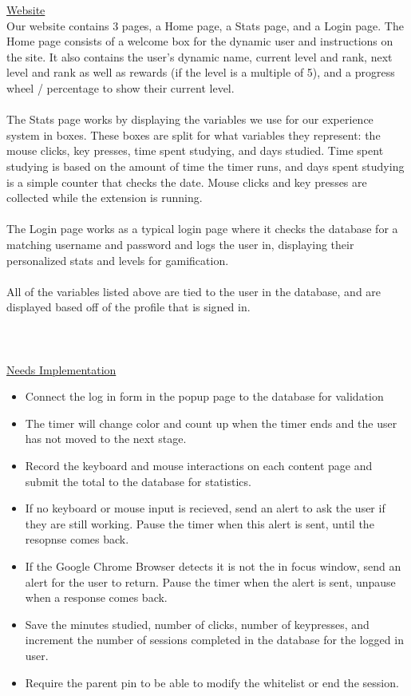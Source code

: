 \documentclass[12pt]{article}
\begin{document}
\noindent \underline{Website} \\
Our website contains 3 pages, a Home page, a Stats page, and a Login page. The Home page consists of a welcome box for the dynamic user and instructions on the site. It also contains the user’s dynamic name, current level and rank, next level and rank as well as rewards (if the level is a multiple of 5), and a progress wheel / percentage to show their current level.
\\\\The Stats page works by displaying the variables we use for our experience system in boxes. These boxes are split for what variables they represent: the mouse clicks, key presses, time spent studying, and days studied. Time spent studying is based on the amount of time the timer runs, and days spent studying is a simple counter that checks the date. Mouse clicks and key presses are collected while the extension is running.
\\\\The Login page works as a typical login page where it checks the database for a matching username and password and logs the user in, displaying their personalized stats and levels for gamification.
\\\\All of the variables listed above are tied to the user in the database, and are displayed based off of the profile that is signed in.
\\\\

\\\\\noindent
\underline{Needs Implementation}\\
\begin{itemize}
    \item Connect the log in form in the popup page to the database for validation
    \item The timer will change color and count up when the timer ends and the user has not moved to the next stage.
    \item Record the keyboard and mouse interactions on each content page and submit the total to the database for statistics.
    \item If no keyboard or mouse input is recieved, send an alert to ask the user if they are still working. Pause the timer when this alert is sent, until the resopnse comes back.
    \item If the Google Chrome Browser detects it is not the in focus window, send an alert for the user to return. Pause the timer when the alert is sent, unpause when a response comes back.
    \item Save the minutes studied, number of clicks, number of keypresses, and increment the number of sessions completed in the database for the logged in user. 
    \item Require the parent pin to be able to modify the whitelist or end the session.
\end{itemize}
\end{document}
